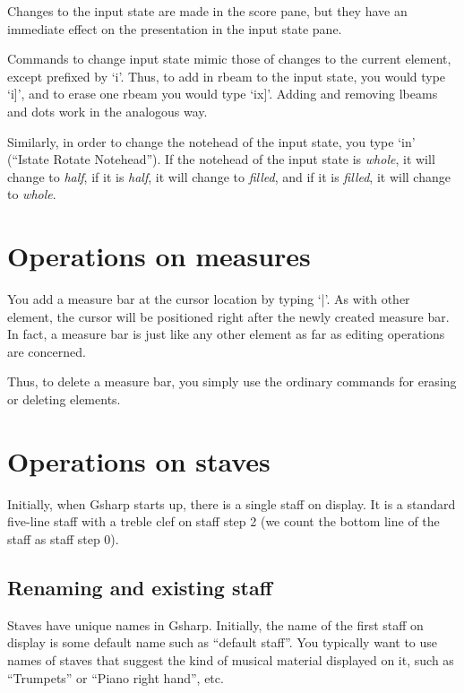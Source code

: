 \documentclass[11pt]{book}
\def\gs{Gsharp}
\def\kbd#1{`#1'}
\def\command#1{``#1''}
\begin{document}
Changes to the input state are made in the score pane, but they have
an immediate effect on the presentation in the input state pane. 

Commands to change input state mimic those of changes to the current
element, except prefixed by \kbd{i}.  Thus, to add in rbeam to the
input state, you would type \kbd{i]}, and to erase one rbeam you would
  type \kbd{ix]}.  Adding and removing lbeams and dots work in the
    analogous way. 

Similarly, in order to change the notehead of the input state, you
type \kbd{in} (\command{Istate Rotate Notehead}).  If the notehead of
the input state is \emph{whole}, it will change to \emph{half}, if
it is \emph{half}, it will change to \emph{filled}, and if it is
\emph{filled}, it will change to \emph{whole}.

\chapter{Operations on measures}

You add a measure bar at the cursor location by typing \kbd{|}.  As
with other element, the cursor will be positioned right after the
newly created measure bar.  In fact, a measure bar is just like any
other element as far as editing operations are concerned.

Thus, to delete a measure bar, you simply use the ordinary commands
for erasing or deleting elements.

\chapter{Operations on staves}
\label{chap-op-staves}

Initially, when {\gs} starts up, there is a single staff on display.
It is a standard five-line staff with a treble clef on staff step 2
(we count the bottom line of the staff as staff step 0).

\section{Renaming and existing staff}

Staves have unique names in {\gs}.  Initially, the name of the first
staff on display is some default name such as ``default staff''.  You
typically want to use names of staves that suggest the kind of musical
material displayed on it, such as ``Trumpets'' or ``Piano right
hand'', etc. 
\end{document}
